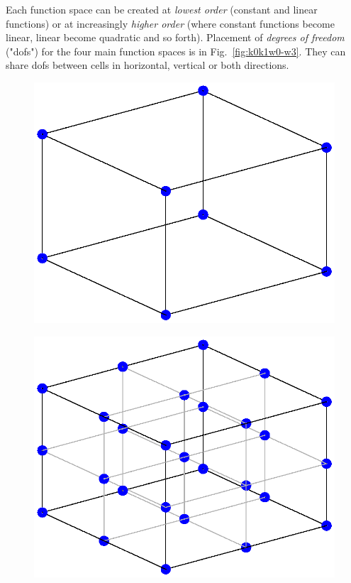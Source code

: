 \documentclass{report}
\begin{document}
Each function space can be created at {\em lowest order} (constant and linear functions) 
or at increasingly {\em higher order} (where constant functions become linear, linear become
quadratic and so forth). Placement of {\em degrees of freedom} ("dofs") for the four main
function spaces is in Fig.~\ref{fig:k0k1w0-w3}. They can share dofs between cells in
horizontal, vertical or both directions. 

%
\begin{figure}
\begin{minipage}{.5\textwidth}
  \centering
  \includegraphics[width=0.7\linewidth]{lfricdoc_figures/k0_W0_dofs.eps}
  \label{fig:k0w0}
\end{minipage}%
\begin{minipage}{.5\textwidth}
  \centering
  \includegraphics[width=0.7\linewidth]{lfricdoc_figures/k1_W0_dofs.eps}
  \label{fig:k0w02}
\end{minipage}


\end{figure}
\end{document}
